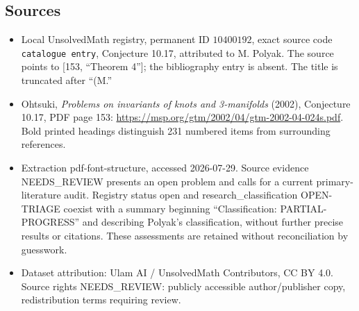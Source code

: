\documentclass[11pt]{article}
\begin{document}
\subsection{Sources}
\begin{itemize}
\item Local UnsolvedMath registry, permanent ID \(10400192\), exact source code \texttt{catalogue entry}, Conjecture 10.17, attributed to M. Polyak. The source points to [153, ``Theorem 4'']; the bibliography entry is absent. The title is truncated after ``(M.''
\item Ohtsuki, \emph{Problems on invariants of knots and 3-manifolds} (2002), Conjecture 10.17, PDF page 153: \url{https://msp.org/gtm/2002/04/gtm-2002-04-024s.pdf}. Bold printed headings distinguish 231 numbered items from surrounding references.
\item Extraction pdf-font-structure, accessed 2026-07-29. Source evidence NEEDS\_REVIEW presents an open problem and calls for a current primary-literature audit. Registry status open and research\_classification OPEN-TRIAGE coexist with a summary beginning ``Classification: PARTIAL-PROGRESS'' and describing Polyak's classification, without further precise results or citations. These assessments are retained without reconciliation by guesswork.
\item Dataset attribution: Ulam AI / UnsolvedMath Contributors, CC BY 4.0. Source rights NEEDS\_REVIEW: publicly accessible author/publisher copy, redistribution terms requiring review.
\end{itemize}
\end{document}
